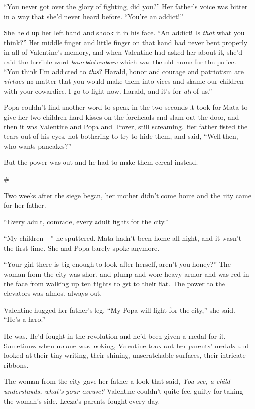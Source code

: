 “You never got over the glory of fighting, did you?” Her father’s
voice was bitter in a way that she’d never heard before. “You’re an
addict!”

She held up her left hand and shook it in his face. “An addict! Is
\emph{that} what you think?” Her middle finger and little finger on
that hand had never bent properly in all of Valentine’s memory, and
when Valentine had asked her about it, she’d said the terrible word
\emph{knucklebreakers} which was the old name for the police. “You
think I’m addicted to \emph{this}? Harald, honor and courage and
patriotism are \emph{virtues} no matter that you would make them
into vices and shame our children with your cowardice. I go to
fight now, Harald, and it’s for \emph{all} of us.”

Popa couldn’t find another word to speak in the two seconds it took
for Mata to give her two children hard kisses on the foreheads and
slam out the door, and then it was Valentine and Popa and Trover,
still screaming. Her father fisted the tears out of his eyes, not
bothering to try to hide them, and said, “Well then, who wants
pancakes?”

But the power was out and he had to make them cereal instead.

\#

Two weeks after the siege began, her mother didn’t come home and
the city came for her father.

“Every adult, comrade, every adult fights for the city.”

“My children—” he sputtered. Mata hadn’t been home all night, and
it wasn’t the first time. She and Popa barely spoke anymore.

“Your girl there is big enough to look after herself, aren’t you
honey?” The woman from the city was short and plump and wore heavy
armor and was red in the face from walking up ten flights to get to
their flat. The power to the elevators was almost always out.

Valentine hugged her father’s leg. “My Popa will fight for the
city,” she said. “He’s a hero.”

He was. He’d fought in the revolution and he’d been given a medal
for it. Sometimes when no one was looking, Valentine took out her
parents’ medals and looked at their tiny writing, their shining,
unscratchable surfaces, their intricate ribbons.

The woman from the city gave her father a look that said,
\emph{You see, a child understands, what’s your excuse?} Valentine
couldn’t quite feel guilty for taking the woman’s side. Leeza’s
parents fought every day.

